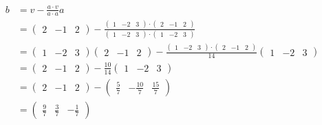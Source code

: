 \documentclass[12pt, fleqn, leqno]{extreport}
\begin{document}
\begin{equation}
    \begin{split}
        b &= v - \frac{a \cdot v}{a \cdot a}a
        \\ &=
        \begin{pmatrix}
            2 & -1 & 2
        \end{pmatrix}
        - \frac{
            \begin{pmatrix}
                1 & -2 & 3
            \end{pmatrix}
            \cdot
            \begin{pmatrix}
                2 & -1 & 2
            \end{pmatrix}
        }{
            \begin{pmatrix}
                1 & -2 & 3
            \end{pmatrix}
            \cdot
            \begin{pmatrix}
                1 & -2 & 3
            \end{pmatrix}
        }
        \\ &=
        \begin{pmatrix}
            1 & -2 & 3
        \end{pmatrix}
        \begin{pmatrix}
            2 & -1 & 2
        \end{pmatrix}
        - \frac{
            \begin{pmatrix}
                1 & -2 & 3
            \end{pmatrix}
            \cdot
            \begin{pmatrix}
                2 & -1 & 2
            \end{pmatrix}
        }{14}
        \begin{pmatrix}
            1 & -2 & 3
        \end{pmatrix}
        \\ &=
        \begin{pmatrix}
            2 & -1 & 2
        \end{pmatrix}
        - \frac{10}{14}
        \begin{pmatrix}
            1 & -2 & 3
        \end{pmatrix}
        \\ &=
        \begin{pmatrix}
            2 & -1 & 2
        \end{pmatrix}
        -
        \begin{pmatrix}
            \frac{5}{7} & -\frac{10}{7} & \frac{15}{7}
        \end{pmatrix}
        \\ &=
        \begin{pmatrix}
            \frac{9}{7} & \frac{3}{7} & -\frac{1}{7}
        \end{pmatrix}
    \end{split}
\end{equation}
\end{document}

